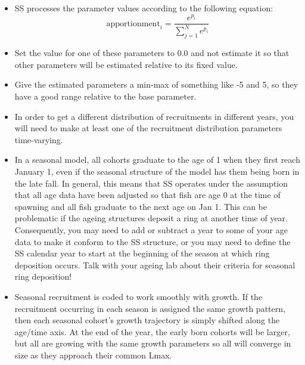	\begin{itemize}
		\item SS processes the parameter values according to the following equation:
		\begin{equation}
		\text{apportionment}_i = \frac{e^{p_i}}{\sum_{j=1}^{N}e^{p_i}}
		\end{equation}
		\item Set the value for one of these parameters to 0.0 and not estimate it so that other parameters will be estimated relative to its fixed value.
		\item Give the estimated parameters a min-max of something like -5 and 5, so they have a good range relative to the base parameter.
		\item In order to get a different distribution of recruitments in different years, you will need to make at least one of the recruitment distribution parameters time-varying.
		\item In a seasonal model, all cohorts graduate to the age of 1 when they first reach January 1, even if the seasonal structure of the model has them being born in the late fall.  In general, this means that SS operates under the assumption that all age data have been adjusted so that fish are age 0 at the time of spawning and all fish graduate to the next age on Jan 1.  This can be problematic if the ageing structures deposit a ring at another time of year.  Consequently, you may need to add or subtract a year to some of your age data to make it conform to the SS structure, or you may need to define the SS calendar year to start at the beginning of the season at which ring deposition occurs.  Talk with your ageing lab about their criteria for seasonal ring deposition!
		\item Seasonal recruitment is coded to work smoothly with growth.  If the recruitment occurring in each season is assigned the same growth pattern, then each seasonal cohort’s growth trajectory is simply shifted along the age/time axis.  At the end of the year, the early born cohorts will be larger, but all are growing with the same growth parameters so all will converge in size as they approach their common Lmax.

\end{itemize}
